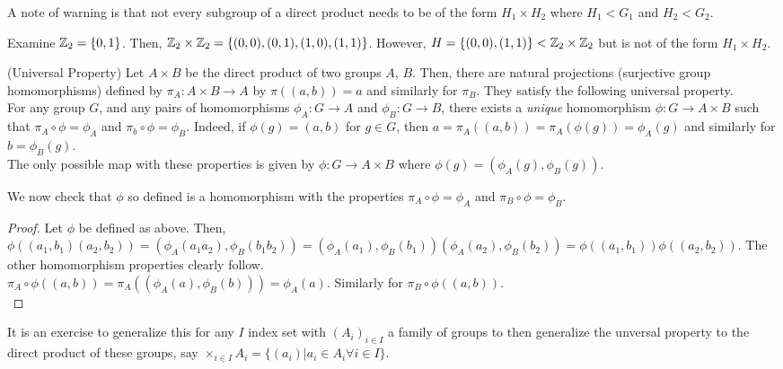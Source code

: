 \documentclass[11pt,leqno,oneside]{amsart}
\newcommand{\subgroup}{\mathrel{<}}
\begin{document}
A note of warning is that not every subgroup of a direct product needs to be
of the form $H_1 \times H_2$ where $H_1 \subgroup G_1$ and $H_2 \subgroup G_2$.

\begin{example*}
    Examine ${\mathbb Z}_2 = \{0,1\}$. Then, ${\mathbb Z}_2 \times {\mathbb Z}_2 =
    \{(0,0),(0,1),(1,0),(1,1)\}$.  However, $H = \{(0,0),(1,1)\} \subgroup \Z_2
    \times \Z_2$ but is not of the form $H_1 \times H_2$.
\end{example*}

\begin{rmk}
    (Universal Property) Let $A \times B$ be the direct product of two groups
    $A$, $B$. Then, there are natural projections (surjective group
    homomorphisms) defined by $\pi_A: A \times B \to A$ by $\pi( (a,b) ) = a$
    and similarly for $\pi_B$. They satisfy the following universal property. \\

    For any group $G$, and any pairs of homomorphisms $\phi_A: G \to A$ and
    $\phi_B: G \to B$, there exists a \emph{unique} homomorphism $\phi: G \to A
    \times B$ such that $\pi_A \circ \phi = \phi_A$ and $\pi_b \circ \phi =
    \phi_B$. Indeed, if $\phi(g) = (a,b)$ for $g \in G$, then $a = \pi_A( (a,b)
    ) = \pi_A(\phi(g)) = \phi_A(g)$ and similarly for $b = \phi_B(g)$. \\

    The only possible map with these properties is given by $\phi: G \to A
    \times B$ where $\phi(g) = (\phi_A(g), \phi_B(g))$.

    We now check that $\phi$ so defined is a homomorphism with the properties
    $\pi_A \circ \phi = \phi_A$ and $\pi_B \circ \phi = \phi_B$.
\end{rmk}
\begin{proof}
    Let $\phi$ be defined as above. Then, $\phi( (a_1,b_1)(a_2,b_2) ) =
    (\phi_A(a_1a_2), \phi_B(b_1b_2)) =
    (\phi_A(a_1),\phi_B(b_1))(\phi_A(a_2),\phi_B(b_2)) = \phi( (a_1,b_1) )\phi(
    (a_2,b_2) )$. The other homomorphism properties clearly follow. \\

    $\pi_A \circ \phi( (a,b) ) = \pi_A( (\phi_A(a), \phi_B(b)) ) = \phi_A(a)$.
    Similarly for $\pi_B \circ \phi( (a,b))$. \\
\end{proof}
It is an exercise to generalize this for any $I$ index set with $(A_i)_{i \in
I}$ a family of groups to then generalize the unversal property to the direct
product of these groups, say $\times_{i \in I} A_i = \{(a_i) | a_i \in A_i
\forall i \in I\}$. \\
\end{document}
